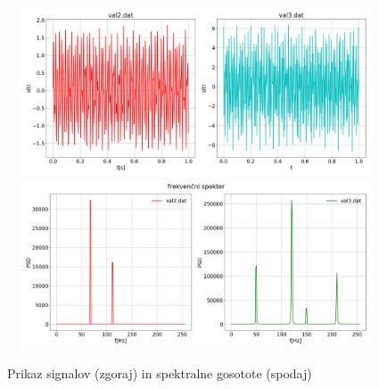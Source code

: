 \documentclass[11pt, a4paper]{article}
\begin{document}
\begin{figure}[H]
\centering
\includegraphics[width=14cm, height=5cm]{prva_prvi.png}
\includegraphics[width=13.5cm, height=5cm]{prva_prvi2.png}
\caption{Prikaz signalov (zgoraj) in spektralne gosotote (spodaj)}  
\end{figure}
\end{document}
